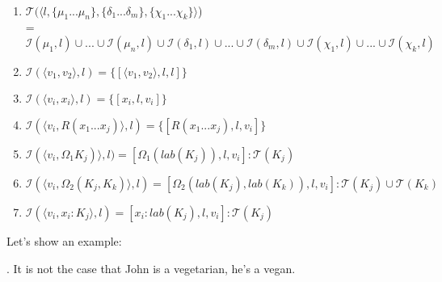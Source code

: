 \begin{definition}~\\\vspace{-12pt}
\begin{enumerate}
  \item $\mathcal{T}(\langle l,\{\mu_1...\mu_n\},
    \{\delta_1...\delta_m\}, \{\chi_1...\chi_k\}\rangle$)\\
    = $\mathcal{I}(\mu_1,l)\cup...\cup \mathcal{I}(\mu_n, l)\cup
      \mathcal{I}(\delta_1,l)\cup...\cup \mathcal{I}(\delta_m,l)\cup
      \mathcal{I}(\chi_1,l)\cup...\cup \mathcal{I}(\chi_k,l)$
  \item $\mathcal{I}(\langle v_1, v_2 \rangle,l)
    = \{[\langle v_1, v_2 \rangle,l,l]\}$
  \item $\mathcal{I}(\langle v_i, x_i \rangle,l)
    = \{[x_i,l,v_i]\}$
  \item $\mathcal{I}(\langle v_i, R(x_1...x_j) \rangle,l)
    = \{[R(x_1...x_j),l,v_i]\}$
  \item $\mathcal{I}(\langle v_i, \Omega_1 K_j) \rangle,l)
    = [\Omega_1 (lab(K_j)),l,v_i] : \mathcal{T}(K_j)$
  \item $\mathcal{I}(\langle v_i,  \Omega_2(K_j, K_k) \rangle,l)
    = [\Omega_2(lab(K_j),lab(K_k)),l,v_i] : \mathcal{T}(K_j)
      \cup \mathcal{T}(K_k)$
  \item $\mathcal{I}(\langle v_i, x_i:K_j \rangle,l)
    = [x_i:lab(K_j),l,v_i] : \mathcal{T}(K_j)$
\end{enumerate}
\end{definition}

\noindent Let's show an example:

\ex. It is not the case that John is a vegetarian, he's a vegan.

